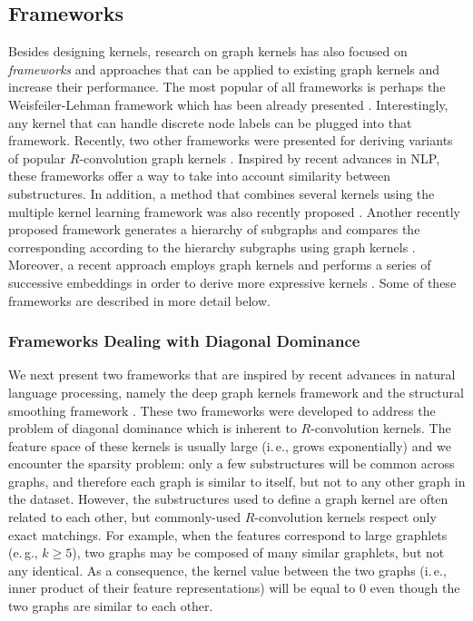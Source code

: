 \documentclass[twoside,11pt]{article}
\newcommand{\eg}{e.\,g., }
\newcommand{\ie}{i.\,e., }
\begin{document}
\subsection{Frameworks}
Besides designing kernels, research on graph kernels has also focused on \textit{frameworks} and approaches that can be applied to existing graph kernels and increase their performance.
The most popular of all frameworks is perhaps the Weisfeiler-Lehman framework which has been already presented .
Interestingly, any kernel that can handle discrete node labels can be plugged into that framework.
Recently, two other frameworks were presented for deriving variants of popular $R$-convolution graph kernels .
Inspired by recent advances in NLP, these frameworks offer a way to take into account similarity between substructures.
In addition, a method that combines several kernels using the multiple kernel learning framework was also recently proposed .
Another recently proposed framework generates a hierarchy of subgraphs and compares the corresponding according to the hierarchy subgraphs using graph kernels .
Moreover, a recent approach employs graph kernels and performs a series of successive embeddings in order to derive more expressive kernels .
Some of these frameworks are described in more detail below.

\subsubsection{Frameworks Dealing with Diagonal Dominance}
We next present two frameworks that are inspired by recent advances in natural language processing, namely the deep graph kernels framework  and the structural smoothing framework . 
These two frameworks were developed to address the problem of diagonal dominance which is inherent to $R$-convolution kernels.
The feature space of these kernels is usually large (\ie grows exponentially) and we encounter the sparsity problem: only a few substructures will be common across graphs, and therefore each graph is similar to itself, but not to any other graph in the dataset.
However, the substructures used to define a graph kernel are often related to each other, but commonly-used $R$-convolution kernels respect only exact matchings. 
For example, when the features correspond to large graphlets (\eg $k \geq 5$), two graphs may be composed of many similar graphlets, but not any identical.
As a consequence, the kernel value between the two graphs (\ie inner product of their feature representations) will be equal to $0$ even though the two graphs are similar to each other.
\end{document}
